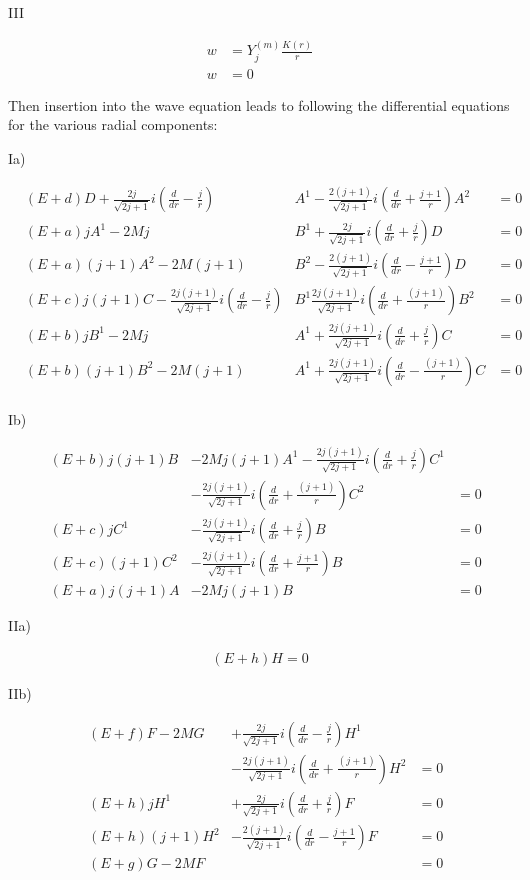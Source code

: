 \documentclass{article}
\newcommand{\nequ}[2]{
\begin{align*}
#1
\tag{#2}
\end{align*}
}
\newcommand{\uequ}[1]{
\begin{align*}
#1
\end{align*}
}
\begin{document}
III
\nequ{
w &= Y^{(m)}_j \frac{K(r)}{r}\\
w &= 0
}{11}

Then insertion into the wave equation leads to following the differential equations for the various radial components:

Ia)
\nequ{
&(E+d)D + \frac{2j}{\sqrt{2j+1}} i \left(\frac{d}{{dr}} - \frac{j}{r}\right)&A^1 -
\frac{2(j+1)}{\sqrt{2j+1}} i \left(\frac{d}{{dr}} + \frac{j+1}{r}\right)A^2 &= 0\\
&(E+a)jA^1  - 2Mj &B^1 +
\frac{2j}{\sqrt{2j+1}} i \left(\frac{d}{{dr}} + \frac{j}{r}\right)D &= 0\\
&(E+a)(j+1)A^2 - 2M(j+1)&B^2 -
\frac{2(j+1)}{\sqrt{2j+1}} i \left(\frac{d}{{dr}} - \frac{j+1}{r}\right)D &= 0\\
&(E+c)j(j+1)C - \frac{2j(j+1)}{\sqrt{2j+1}} i \left(\frac{d}{{dr}} - \frac{j}{r}\right)&B^1
\frac{2j(j+1)}{\sqrt{2j+1}} i \left(\frac{d}{{dr}} + \frac{(j+1)}{r}\right)B^2 &= 0\\
&(E+b)jB^1  - 2Mj &A^1 +
\frac{2j(j+1)}{\sqrt{2j+1}} i \left(\frac{d}{{dr}} + \frac{j}{r}\right)C &= 0\\
&(E+b)(j+1)B^2 - 2M(j+1) &A^1 +
\frac{2j(j+1)}{\sqrt{2j+1}} i \left(\frac{d}{{dr}} - \frac{(j+1)}{r}\right)C &= 0\\
}{12}

Ib)
\nequ{
&(E+b)j(j+1)B &- 2Mj(j+1) A^1 - 
\frac{2j(j+1)}{\sqrt{2j+1}} i \left(\frac{d}{{dr}} + \frac{j}{r}\right)C^1\\
& &- \frac{2j(j+1)}{\sqrt{2j+1}} i \left(\frac{d}{{dr}} + \frac{(j+1)}{r}\right)C^2 &= 0\\
&(E+c)jC^1 &- \frac{2j(j+1)}{\sqrt{2j+1}} i \left(\frac{d}{{dr}} + \frac{j}{r}\right)B &= 0\\
&(E+c)(j+1)C^2 &- \frac{2j(j+1)}{\sqrt{2j+1}} i \left(\frac{d}{{dr}} + \frac{j+1}{r}\right)B &= 0\\
&(E+a)j(j+1)A &- 2Mj(j+1) B &= 0
}{13}

IIa)
\uequ{
(E+h)H = 0
}

IIb)
\nequ{
&(E+f)F - 2MG &+ \frac{2j}{\sqrt{2j+1}} i \left(\frac{d}{{dr}} - \frac{j}{r}\right)H^1\\
& &- \frac{2j(j+1)}{\sqrt{2j+1}} i \left(\frac{d}{{dr}} + \frac{(j+1)}{r}\right)H^2 &= 0\\
&(E+h)jH^1 &+ \frac{2j}{\sqrt{2j+1}} i \left(\frac{d}{{dr}} + \frac{j}{r}\right)F &= 0\\
&(E+h)(j+1)H^2 &- \frac{2(j+1)}{\sqrt{2j+1}} i \left(\frac{d}{{dr}} - \frac{j+1}{r}\right)F &=0\\
&(E+g)G - 2MF & & = 0
}{14}
\end{document}

